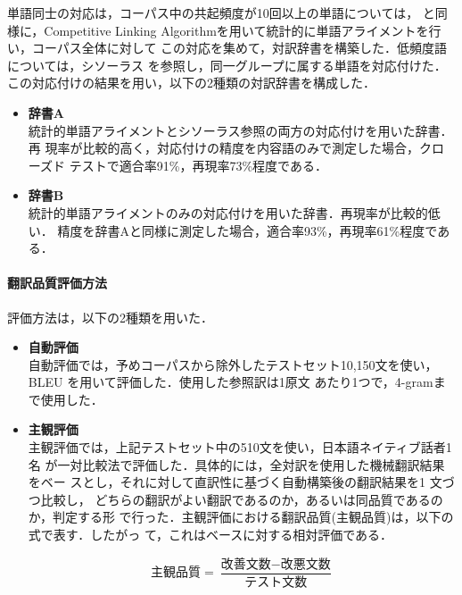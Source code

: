 単語同士の対応は，コーパス中の共起頻度が10回以上の単語については，
と同様に，Competitive Linking
Algorithmを用いて統計的に単語アライメントを行い，コーパス全体に対して
この対応を集めて，対訳辞書を構築した．低頻度語については，シソーラス
\cite{Thesaurus1984j}を参照し，同一グループに属する単語を対応付けた．
この対応付けの結果を用い，以下の2種類の対訳辞書を構成した．

\begin{itemize}

\item {\bf 辞書A} \\
統計的単語アライメントとシソーラス参照の両方の対応付けを用いた辞書．再
現率が比較的高く，対応付けの精度を内容語のみで測定した場合，クローズド
テストで適合率91\%，再現率73\%程度である．

\item {\bf 辞書B} \\
統計的単語アライメントのみの対応付けを用いた辞書．再現率が比較的低い．
精度を辞書Aと同様に測定した場合，適合率93\%，再現率61\%程度である．

\end{itemize}

\paragraph{翻訳品質評価方法}

評価方法は，以下の2種類を用いた．

\begin{itemize}
\item {\bf 自動評価} \\
自動評価では，予めコーパスから除外したテストセット10,150文を使い，BLEU
\cite{papineni-EtAl:2002:ACL} を用いて評価した．使用した参照訳は1原文
あたり1つで，4-gramまで使用した．

\item {\bf 主観評価} \\
主観評価では，上記テストセット中の510文を使い，日本語ネイティブ話者1名
が一対比較法で評価した．具体的には，全対訳を使用した機械翻訳結果をベー
スとし，それに対して直訳性に基づく自動構築後の翻訳結果を1 文づつ比較し，
どちらの翻訳がよい翻訳であるのか，あるいは同品質であるのか，判定する形
で行った．主観評価における翻訳品質(主観品質)は，以下の式で表す．したがっ
て，これはベースに対する相対評価である．

\begin{equation}
\mbox{主観品質} = \frac{\mbox{改善文数} - \mbox{改悪文数}}{\mbox{テスト文数}}
\end{equation}
\end{itemize}


